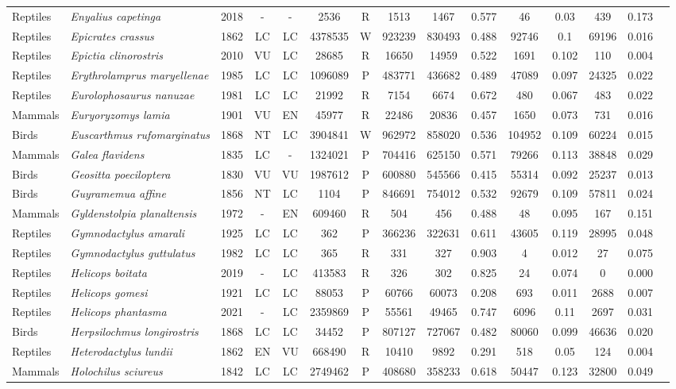 \documentclass[12pt,openright,oneside,a4paper,english]{abntex2}
\begin{document}
\begin{landscape}
\begin{longtable}{llccccccccccccc}
		Reptiles&\textit{Enyalius capetinga}&2018&-&-&2536&R&1513&1467&0.577&46&0.03&439&0.173\\
		Reptiles&\textit{Epicrates crassus}&1862&LC&LC&4378535&W&923239&830493&0.488&92746&0.1&69196&0.016\\
		Reptiles&\textit{Epictia clinorostris}&2010&VU&LC&28685&R&16650&14959&0.522&1691&0.102&110&0.004\\
		Reptiles&\textit{Erythrolamprus maryellenae}&1985&LC&LC&1096089&P&483771&436682&0.489&47089&0.097&24325&0.022\\
		Reptiles&\textit{Eurolophosaurus nanuzae}&1981&LC&LC&21992&R&7154&6674&0.672&480&0.067&483&0.022\\
		Mammals&\textit{Euryoryzomys lamia}&1901&VU&EN&45977&R&22486&20836&0.457&1650&0.073&731&0.016\\
		Birds&\textit{Euscarthmus rufomarginatus}&1868&NT&LC&3904841&W&962972&858020&0.536&104952&0.109&60224&0.015\\
		Mammals&\textit{Galea flavidens}&1835&LC&-&1324021&P&704416&625150&0.571&79266&0.113&38848&0.029\\
		Birds&\textit{Geositta poeciloptera}&1830&VU&VU&1987612&P&600880&545566&0.415&55314&0.092&25237&0.013\\
		Birds&\textit{Guyramemua affine}&1856&NT&LC&1104&P&846691&754012&0.532&92679&0.109&57811&0.024\\
		Mammals&\textit{Gyldenstolpia planaltensis}&1972&-&EN&609460&R&504&456&0.488&48&0.095&167&0.151\\
		Reptiles&\textit{Gymnodactylus amarali}&1925&LC&LC&362&P&366236&322631&0.611&43605&0.119&28995&0.048\\
		Reptiles&\textit{Gymnodactylus guttulatus}&1982&LC&LC&365&R&331&327&0.903&4&0.012&27&0.075\\
		Reptiles&\textit{Helicops boitata}&2019&-&LC&413583&R&326&302&0.825&24&0.074&0&0.000\\
		Reptiles&\textit{Helicops gomesi}&1921&LC&LC&88053&P&60766&60073&0.208&693&0.011&2688&0.007\\
		Reptiles&\textit{Helicops phantasma}&2021&-&LC&2359869&P&55561&49465&0.747&6096&0.11&2697&0.031\\
		Birds&\textit{Herpsilochmus longirostris}&1868&LC&LC&34452&P&807127&727067&0.482&80060&0.099&46636&0.020\\
		Reptiles&\textit{Heterodactylus lundii}&1862&EN&VU&668490&R&10410&9892&0.291&518&0.05&124&0.004\\
		Mammals&\textit{Holochilus sciureus}&1842&LC&LC&2749462&P&408680&358233&0.618&50447&0.123&32800&0.049\\

\end{longtable}
\end{landscape}
\end{document}
